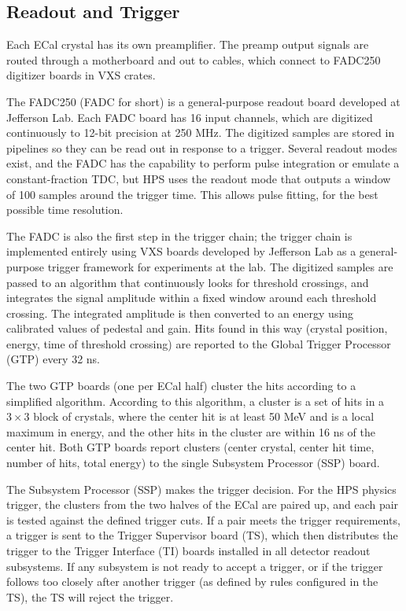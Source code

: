 \subsection{Readout and Trigger}
\label{sec:trigger}
Each ECal crystal has its own preamplifier.
The preamp output signals are routed through a motherboard and out to cables, which connect to FADC250 digitizer boards in VXS crates.

The FADC250 (FADC for short) is a general-purpose readout board developed at Jefferson Lab.
Each FADC board has 16 input channels, which are digitized continuously to 12-bit precision at 250 MHz.
The digitized samples are stored in pipelines so they can be read out in response to a trigger.
Several readout modes exist, and the FADC has the capability to perform pulse integration or emulate a constant-fraction TDC, but HPS uses the readout mode that outputs a window of 100 samples around the trigger time.
This allows pulse fitting, for the best possible time resolution.

The FADC is also the first step in the trigger chain; the trigger chain is implemented entirely using VXS boards developed by Jefferson Lab as a general-purpose trigger framework for experiments at the lab.
The digitized samples are passed to an algorithm that continuously looks for threshold crossings, and integrates the signal amplitude within a fixed window around each threshold crossing.
The integrated amplitude is then converted to an energy using calibrated values of pedestal and gain.
Hits found in this way (crystal position, energy, time of threshold crossing) are reported to the Global Trigger Processor (GTP) every 32 ns.

The two GTP boards (one per ECal half) cluster the hits according to a simplified algorithm.
According to this algorithm, a cluster is a set of hits in a $3\times 3$ block of crystals, where the center hit is at least 50 MeV and is a local maximum in energy, and the other hits in the cluster are within 16 ns of the center hit.
Both GTP boards report clusters (center crystal, center hit time, number of hits, total energy) to the single Subsystem Processor (SSP) board.

The Subsystem Processor (SSP) makes the trigger decision.
For the HPS physics trigger, the clusters from the two halves of the ECal are paired up, and each pair is tested against the defined trigger cuts.
If a pair meets the trigger requirements, a trigger is sent to the Trigger Supervisor board (TS), which then distributes the trigger to the Trigger Interface (TI) boards installed in all detector readout subsystems.
If any subsystem is not ready to accept a trigger, or if the trigger follows too closely after another trigger (as defined by rules configured in the TS), the TS will reject the trigger.

